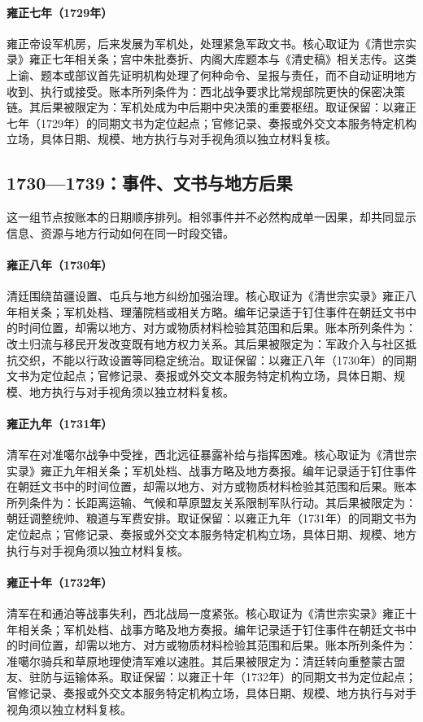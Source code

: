 \hypertarget{ledger:EQ-1729-JUNJICHU-FOUNDING}{}\paragraph{雍正七年（1729年）}雍正帝设军机房，后来发展为军机处，处理紧急军政文书。核心取证为《清世宗实录》雍正七年相关条；宫中朱批奏折、内阁大库题本与《清史稿》相关志传。这类上谕、题本或部议首先证明机构处理了何种命令、呈报与责任，而不自动证明地方收到、执行或接受。账本所列条件为：西北战争要求比常规部院更快的保密决策链。其后果被限定为：军机处成为中后期中央决策的重要枢纽。取证保留：以雍正七年（1729年）的同期文书为定位起点；官修记录、奏报或外交文本服务特定机构立场，具体日期、规模、地方执行与对手视角须以独立材料复核。
\subsection{1730—1739：事件、文书与地方后果}
这一组节点按账本的日期顺序排列。相邻事件并不必然构成单一因果，却共同显示信息、资源与地方行动如何在同一时段交错。
\hypertarget{ledger:EQ-1730-SOUTHWEST-MIAO-GOVERNANCE}{}\paragraph{雍正八年（1730年）}清廷围绕苗疆设置、屯兵与地方纠纷加强治理。核心取证为《清世宗实录》雍正八年相关条；军机处档、理藩院档或相关方略。编年记录适于钉住事件在朝廷文书中的时间位置，却需以地方、对方或物质材料检验其范围和后果。账本所列条件为：改土归流与移民开发改变既有地方权力关系。其后果被限定为：军政介入与社区抵抗交织，不能以行政设置等同稳定统治。取证保留：以雍正八年（1730年）的同期文书为定位起点；官修记录、奏报或外交文本服务特定机构立场，具体日期、规模、地方执行与对手视角须以独立材料复核。
\hypertarget{ledger:EQ-1731-Dzungar-WAR-REVERSE}{}\paragraph{雍正九年（1731年）}清军在对准噶尔战争中受挫，西北远征暴露补给与指挥困难。核心取证为《清世宗实录》雍正九年相关条；军机处档、战事方略及地方奏报。编年记录适于钉住事件在朝廷文书中的时间位置，却需以地方、对方或物质材料检验其范围和后果。账本所列条件为：长距离运输、气候和草原盟友关系限制军队行动。其后果被限定为：朝廷调整统帅、粮道与军费安排。取证保留：以雍正九年（1731年）的同期文书为定位起点；官修记录、奏报或外交文本服务特定机构立场，具体日期、规模、地方执行与对手视角须以独立材料复核。
\hypertarget{ledger:EQ-1732-KOBDO-BATTLE}{}\paragraph{雍正十年（1732年）}清军在和通泊等战事失利，西北战局一度紧张。核心取证为《清世宗实录》雍正十年相关条；军机处档、战事方略及地方奏报。编年记录适于钉住事件在朝廷文书中的时间位置，却需以地方、对方或物质材料检验其范围和后果。账本所列条件为：准噶尔骑兵和草原地理使清军难以速胜。其后果被限定为：清廷转向重整蒙古盟友、驻防与运输体系。取证保留：以雍正十年（1732年）的同期文书为定位起点；官修记录、奏报或外交文本服务特定机构立场，具体日期、规模、地方执行与对手视角须以独立材料复核。
